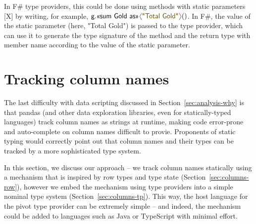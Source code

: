 \documentclass[a4paper,UKenglish]{lipics-v2016}
\theoremstyle{plain}
\theoremstyle{definition}
\newcommand{\langl}{\begin{picture}(4.5,7)
\put(1.1,2.5){\rotatebox{60}{\line(1,0){5.5}}}
\put(1.1,2.5){\rotatebox{300}{\line(1,0){5.5}}}
\end{picture}}
\newcommand{\rangl}{\begin{picture}(4.5,7)
\put(.9,2.5){\rotatebox{120}{\line(1,0){5.5}}}
\put(.9,2.5){\rotatebox{240}{\line(1,0){5.5}}}
\end{picture}}
\newcommand{\str}[1]{\textnormal{\textcolor{strclr}{\sffamily "#1"}}}
\newcommand{\ident}[1]{\textnormal{\sffamily #1}}
\newcommand{\qident}[1]{\textnormal{\sffamily \guillemotleft #1\guillemotright}}
\begin{document}

In F\# type providers, this could be done using methods with static parameters [X] by writing, 
for example, $\ident{g}.\qident{sum Gold as}\langl\str{Total Gold}\rangl()$. In F\#, the value of 
the static parameter (here, \str{Total Gold}) is passed to the type provider, which can use it to
generate the type signature of the method and the return type with member name according to the
value of the static parameter.


\section{Tracking column names}
\label{sec:columns}

The last difficulty with data scripting discussed in Section~\ref{sec:analysis-why} is that pandas 
(and other data exploration libraries, even for statically-typed languages) track column names as 
strings at runtime, making code error-prone and auto-complete on column names difficult to provie.
Proponents of static typing would correctly point out that column names and their types can be
tracked by a more sophisticated type system. 

In this section, we discuss our approach -- we track column names statically using a mechanism
that is inspired by row types and type state (Section~\ref{sec:columns-row}), however we 
embed the mechanism using type providers into a simple nominal type system (Section~\ref{sec:columns-tp}).
This way, the host language for the pivot type provider can be extremely simple -- and indeed, the
mechanism could be added to languages such as Java or TypeScript with minimal effort. 

\end{document}
